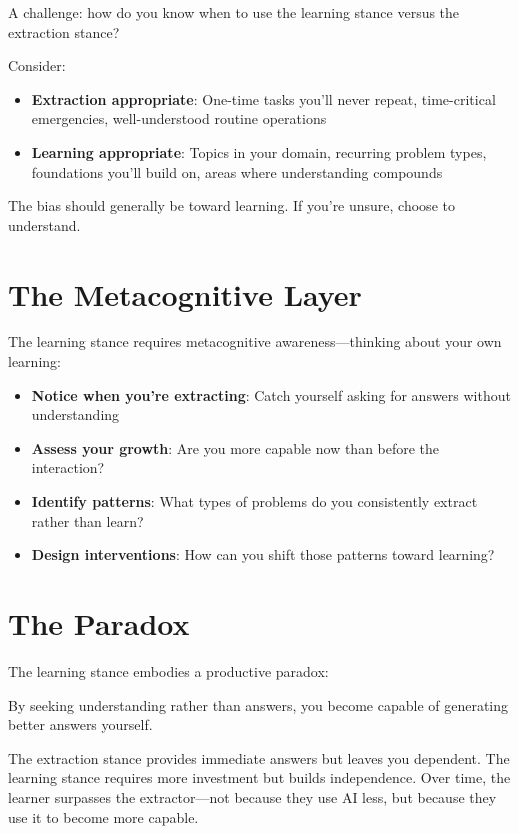 A challenge: how do you know when to use the learning stance versus the extraction stance?

Consider:

\begin{itemize}
    \item \textbf{Extraction appropriate}: One-time tasks you'll never repeat, time-critical emergencies, well-understood routine operations
    \item \textbf{Learning appropriate}: Topics in your domain, recurring problem types, foundations you'll build on, areas where understanding compounds
\end{itemize}

The bias should generally be toward learning. If you're unsure, choose to understand.

\section{The Metacognitive Layer}

The learning stance requires metacognitive awareness---thinking about your own learning:

\begin{itemize}
    \item \textbf{Notice when you're extracting}: Catch yourself asking for answers without understanding
    \item \textbf{Assess your growth}: Are you more capable now than before the interaction?
    \item \textbf{Identify patterns}: What types of problems do you consistently extract rather than learn?
    \item \textbf{Design interventions}: How can you shift those patterns toward learning?
\end{itemize}

\section{The Paradox}

The learning stance embodies a productive paradox:

\begin{quotebox}
By seeking understanding rather than answers, you become capable of generating better answers yourself.
\end{quotebox}

The extraction stance provides immediate answers but leaves you dependent. The learning stance requires more investment but builds independence. Over time, the learner surpasses the extractor---not because they use AI less, but because they use it to become more capable.

